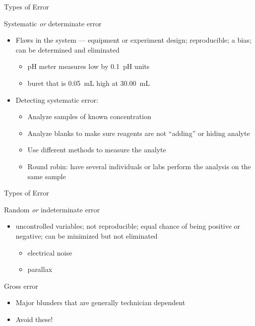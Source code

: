 \documentclass[handout]{beamer}
\begin{document}
\begin{frame}[c]{Types of Error}

	\begin{block}{Systematic \emph{or} determinate error}
			\begin{itemize}
				\item Flaws in the system --- equipment or
					experiment design;
					\alert{reproducible}; a bias; can be
					\alert{determined} and eliminated
					\begin{itemize}
						\item pH meter measures low by
							0.1~pH units
						\item buret that is
							\SI{0.05}{\mL} high at
							\SI{30.00}{\mL}
					\end{itemize}
				\item Detecting systematic error:
					\begin{itemize}
						\item Analyze samples of known
							concentration
						\item Analyze blanks to make
							sure reagents are not
							``adding'' or hiding
							analyte
						\item Use different methods to measure the analyte
						\item Round robin:  have several individuals or labs perform the analysis on the same sample
					\end{itemize}
			\end{itemize}
		\end{block}
	\end{frame}

	\begin{frame}[c]{Types of Error}
			\begin{block}{Random \emph{or} indeterminate error}
				\begin{itemize}
					\item uncontrolled variables; not reproducible; equal chance of being positive or negative; can be minimized but not eliminated
						\begin{itemize}
							\item electrical noise
							\item parallax
						\end{itemize}
				\end{itemize}
			\end{block}

			\begin{block}{Gross error}
				\begin{itemize}
					\item Major blunders that are generally technician dependent
					\item \alert{Avoid these!}
				\end{itemize}
			\end{block}
\end{frame}
\end{document}

